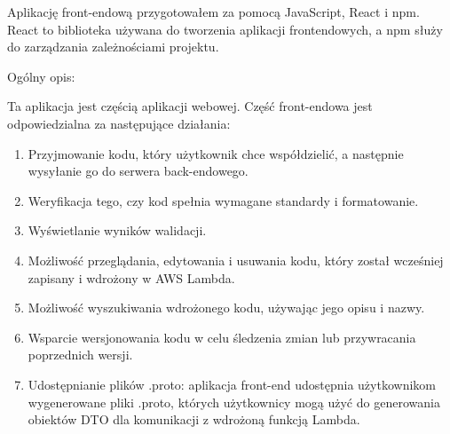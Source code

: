 \documentclass[runningheads,12pt]{llncs}
\begin{document}
Aplikację front-endową przygotowałem za pomocą JavaScript, React i npm.
React to biblioteka używana do tworzenia aplikacji frontendowych, a npm służy do zarządzania zależnościami projektu.

Ogólny opis:

Ta aplikacja jest częścią aplikacji webowej. Część front-endowa jest odpowiedzialna za następujące działania:
\begin{enumerate}
    \item Przyjmowanie kodu, który użytkownik chce współdzielić, a następnie wysyłanie go do serwera back-endowego.
    \item Weryfikacja tego, czy kod spełnia wymagane standardy i formatowanie.
    \item Wyświetlanie wyników walidacji.
    \item Możliwość przeglądania, edytowania i usuwania kodu, który został wcześniej zapisany i wdrożony w AWS Lambda.
    \item Możliwość wyszukiwania wdrożonego kodu, używając jego opisu i nazwy.
    \item Wsparcie wersjonowania kodu w celu śledzenia zmian lub przywracania poprzednich wersji.
    \item Udostępnianie plików .proto: aplikacja front-end udostępnia użytkownikom wygenerowane pliki .proto, których użytkownicy mogą użyć do generowania obiektów DTO dla komunikacji z wdrożoną funkcją Lambda.
\end{enumerate}

\newpage
\end{document}
